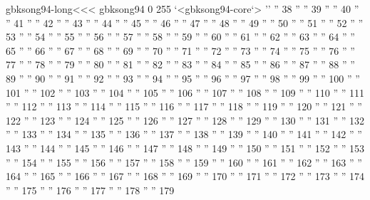 \<gbksong94-long\><<<
gbksong94 0 255
`<gbksong94-core`>
'' ''          38
'' ''          39
'' ''          40
'' ''          41
'' ''          42
'' ''          43
'' ''          44
'' ''          45
'' ''          46
'' ''          47
'' ''          48
'' ''          49
'' ''          50
'' ''          51
'' ''          52
'' ''          53
'' ''          54
'' ''          55
'' ''          56
'' ''          57
'' ''          58
'' ''          59
'' ''          60
'' ''          61
'' ''          62
'' ''          63
'' ''          64
'' ''          65
'' ''          66
'' ''          67
'' ''          68
'' ''          69
'' ''          70
'' ''          71
'' ''          72
'' ''          73
'' ''          74
'' ''          75
'' ''          76
'' ''          77
'' ''          78
'' ''          79
'' ''          80
'' ''          81
'' ''          82
'' ''          83
'' ''          84
'' ''          85
'' ''          86
'' ''          87
'' ''          88
'' ''          89
'' ''          90
'' ''          91
'' ''          92
'' ''          93
'' ''          94
'' ''          95
'' ''          96
'' ''          97
'' ''          98
'' ''          99
'' ''         100
'' ''         101
'' ''         102
'' ''         103
'' ''         104
'' ''         105
'' ''         106
'' ''         107
'' ''         108
'' ''         109
'' ''         110
'' ''         111
'' ''         112
'' ''         113
'' ''         114
'' ''         115
'' ''         116
'' ''         117
'' ''         118
'' ''         119
'' ''         120
'' ''         121
'' ''         122
'' ''         123
'' ''         124
'' ''         125
'' ''         126
'' ''         127
'' ''         128
'' ''         129
'' ''         130
'' ''         131
'' ''         132
'' ''         133
'' ''         134
'' ''         135
'' ''         136
'' ''         137
'' ''         138
'' ''         139
'' ''         140
'' ''         141
'' ''         142
'' ''         143
'' ''         144
'' ''         145
'' ''         146
'' ''         147
'' ''         148
'' ''         149
'' ''         150
'' ''         151
'' ''         152
'' ''         153
'' ''         154
'' ''         155
'' ''         156
'' ''         157
'' ''         158
'' ''         159
'' ''         160
'' ''         161
'' ''         162
'' ''         163
'' ''         164
'' ''         165
'' ''         166
'' ''         167
'' ''         168
'' ''         169
'' ''         170
'' ''         171
'' ''         172
'' ''         173
'' ''         174
'' ''         175
'' ''         176
'' ''         177
'' ''         178
'' ''         179
